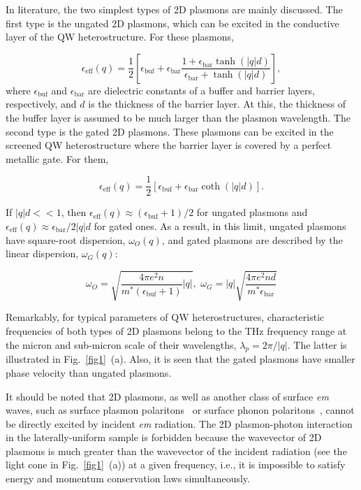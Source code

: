 \documentclass[%
 reprint,
 amsmath,amssymb,
 aps,
]{revtex4-2}
\begin{document}
In literature, the two simplest types of 2D plasmons are mainly discussed. The first type is the ungated 2D plasmons, which can be excited in the conductive layer of the QW heterostructure. For these plasmons,

\begin{equation}
\epsilon_{\text{eff}}(q)=\frac{1}{2}
\left[\epsilon_{\text{buf}}+\epsilon_{\text{bar}}\frac{1+\epsilon_{\text{bar}}\tanh(|q|d)}{\epsilon_{\text{bar}}+\tanh(|q|d)} \right],
\label{eps_ungated}
\end{equation}
where $\epsilon_{\text{buf}}$ and $\epsilon_{\text{bar}}$ are dielectric constants of a buffer and barrier layers, respectively, and $d$ is the thickness of the barrier layer. At this, the thickness of the buffer layer is assumed to be much larger than the plasmon wavelength.
The second type is the gated 2D plasmons. These plasmons can be excited in the screened QW heterostructure where the barrier layer is covered by a perfect metallic gate. For them,

\begin{equation}
\epsilon_{\text{eff}}(q)=\frac{1}{2}
\left[\epsilon_{\text{buf}}+\epsilon_{\text{bar}}\coth(|q|d)\right].
\label{eps_gated}
\end{equation}

If $|q|d<<1$, then $\epsilon_{\text{eff}}(q)\approx(\epsilon_{\text{buf}}+1)/2$ for ungated plasmons and $\epsilon_{\text{eff}}(q)\approx\epsilon_{\text{bar}}/2|q|d$ for gated ones. As a result, in this limit, ungated plasmons have square-root dispersion, $\omega_{O}(q)$,  and gated plasmons are described by the linear dispersion, $\omega_{G}(q)$:

\begin{equation}
\omega_{O}=\sqrt{\frac{4\pi e^2 n}{m^{*}(\epsilon_{{\text{buf}}}+1)}|q|},\,\,
\omega_{G}=|q|\sqrt{\frac{4\pi e^2 n d}{m^{*}\epsilon_{\text{bar}}}}
\label{limits}
\end{equation}

Remarkably, for typical parameters of QW heterostructures, characteristic frequencies of both types of 2D plasmons belong to the THz frequency range at the micron and sub-micron scale of their wavelengths, $\lambda_p = 2 \pi / |q|$.
The latter is illustrated in Fig.~\ref{fig1}~(a). Also, it is seen that the gated plasmons have smaller phase velocity than ungated plasmons.

 It should be noted that 2D plasmons, as well as another class of surface \textit{em} waves, such as surface plasmon polaritons~\cite{Baltar12} or surface phonon polaritons~\cite{Huber2008}, cannot be directly excited by incident \textit{em} radiation. 
 The 2D plasmon-photon interaction in the laterally-uniform sample is forbidden because the wavevector of 2D plasmons is much greater than the wavevector of the incident radiation (see the light cone in Fig.~\ref{fig1}~(a)) at a given frequency, i.e., it is impossible to satisfy energy and momentum conservation laws simultaneously.
\end{document}
